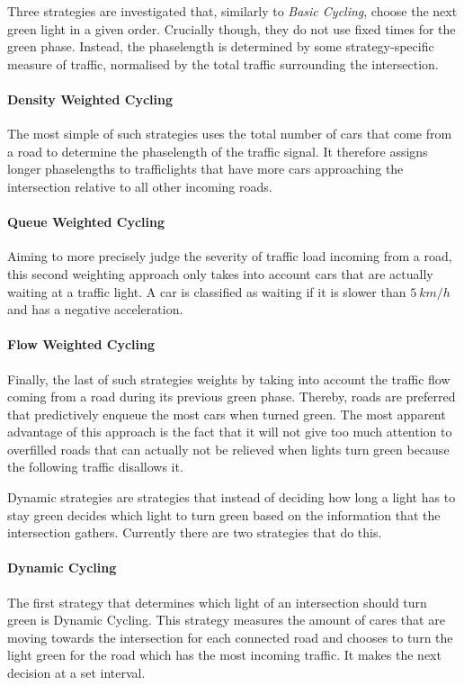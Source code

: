 \documentclass[11pt]{article}
\begin{document}
Three strategies are investigated that, similarly to \textit{Basic Cycling}, choose the next green light in a given order. Crucially though, they do not use fixed times for the green phase. Instead, the phaselength is determined by some strategy-specific measure of traffic, normalised by the total traffic surrounding the intersection.

\paragraph{Density Weighted Cycling} The most simple of such strategies uses the total number of cars that come from a road to determine the phaselength of the traffic signal. It therefore assigns longer phaselengths to trafficlights that have more cars approaching the intersection relative to all other incoming roads.

\paragraph{Queue Weighted Cycling} Aiming to more precisely judge the severity of traffic load incoming from a road, this second weighting approach only takes into account cars that are actually waiting at a traffic light. A car is classified as waiting if it is slower than $5\ km/h$ and has a negative acceleration.

\paragraph{Flow Weighted Cycling} Finally, the last of such strategies weights by taking into account the traffic flow coming from a road during its previous green phase. Thereby, roads are preferred that predictively enqueue the most cars when turned green. The most apparent advantage of this approach is the fact that it will not give too much attention to overfilled roads that can actually not be relieved when lights turn green because the following traffic disallows it.

Dynamic strategies are strategies that instead of deciding how long a light has to stay green decides which light to turn green based on the information that the intersection gathers. Currently there are two strategies that do this.

\paragraph{Dynamic Cycling} The first strategy that determines which light of an intersection should turn green is Dynamic Cycling. This strategy measures the amount of cares that are moving towards the intersection for each connected road and chooses to turn the light green for the road which has the most incoming traffic. It makes the next decision at a set interval.
\end{document}
